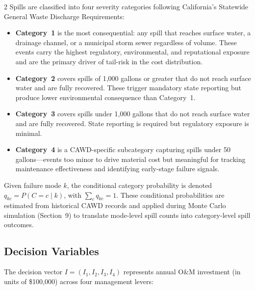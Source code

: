 \documentclass[10pt]{article}
\begin{document}
\begin{multicols}{2}
Spills are classified into four severity categories following California's
Statewide General Waste Discharge Requirements:
 
\begin{itemize}[leftmargin=*]
    \item \textbf{Category~1} is the most consequential: any spill that
    reaches surface water, a drainage channel, or a municipal storm sewer
    regardless of volume. These events carry the highest regulatory,
    environmental, and reputational exposure and are the primary driver
    of tail-risk in the cost distribution.
    \item \textbf{Category~2} covers spills of 1{,}000 gallons or greater
    that do not reach surface water and are fully recovered. These trigger
    mandatory state reporting but produce lower environmental consequence
    than Category~1.
    \item \textbf{Category~3} covers spills under 1{,}000 gallons that do
    not reach surface water and are fully recovered. State reporting is
    required but regulatory exposure is minimal.
    \item \textbf{Category~4} is a CAWD-specific subcategory capturing
    spills under 50 gallons---events too minor to drive material cost but
    meaningful for tracking maintenance effectiveness and identifying
    early-stage failure signals.
\end{itemize}
 
Given failure mode $k$, the conditional category probability is denoted
$q_{kc} = P(C = c \mid k)$, with $\sum_c q_{kc} = 1$. These conditional
probabilities are estimated from historical CAWD records and applied
during Monte Carlo simulation (Section~9) to translate mode-level spill
counts into category-level spill outcomes.
 
\subsection{Decision Variables}

The decision vector $I = (I_1, I_2, I_3, I_4)$ represents annual O\&M
investment (in units of \$100{,}000) across four management levers:
 

\end{multicols}
\end{document}
